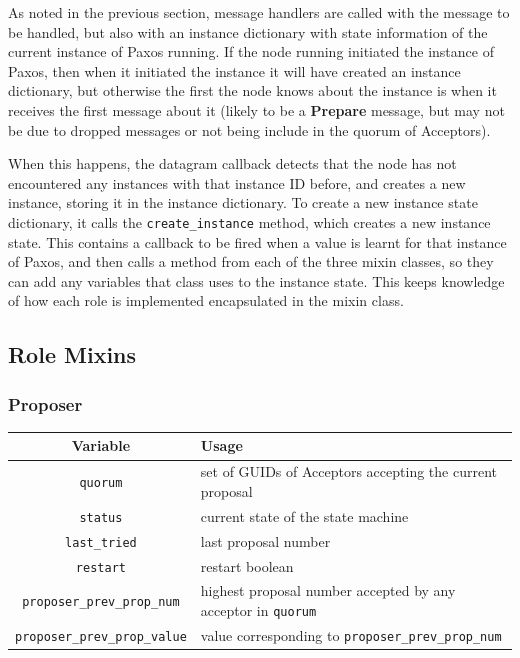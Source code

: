 \documentclass[12pt,twoside,notitlepage]{report}
\newcommand{\msg}[1] {{\bf #1}}         %
\begin{document}
\label{sec:paxos-instance}

As noted in the previous section, message handlers are called with the message to be handled, but
also with an instance dictionary with state information of the current instance of Paxos running.
If the node running initiated the instance of Paxos, then when it initiated the instance it will
have created an instance dictionary, but otherwise the first the node knows about the instance is
when it receives the first message about it (likely to be a \msg{Prepare} message, but may not be
due to dropped messages or not being include in the quorum of Acceptors).

When this happens, the datagram callback detects that the node has not encountered any instances
with that instance ID before, and creates a new instance, storing it in the instance dictionary.
To create a new instance state dictionary, it calls the \verb+create_instance+ method, which
creates a new instance state. This contains a callback to be fired when a value is learnt for that
instance of Paxos, and then calls a method from each of the three mixin classes, so they can add
any variables that class uses to the instance state. This keeps knowledge of how each role is
implemented encapsulated in the mixin class.

\subsection{Role Mixins}

\subsubsection{Proposer}


\begin{tabular}{ | c | p{7cm} | }
  \hline
  {\bf Variable} & {\bf Usage} \\ \hline
  \verb+quorum+ & set of GUIDs of Acceptors accepting the current proposal \\ \hline
  \verb+status+ & current state of the state machine \\ \hline
  \verb+last_tried+ & last proposal number \\ \hline
  \verb+restart+ & restart boolean \\ \hline
  \verb+proposer_prev_prop_num+ & highest proposal number accepted by any acceptor in \verb+quorum+ \\ \hline
  \verb+proposer_prev_prop_value+  & value corresponding to \verb+proposer_prev_prop_num+ \\ \hline
\end{tabular}
\end{document}
